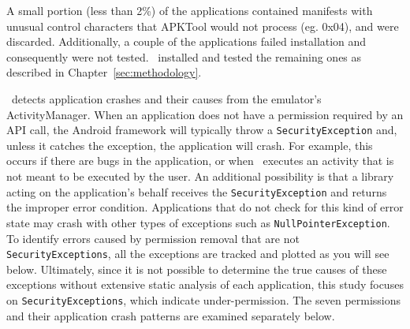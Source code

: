 A small portion (less than 2\%) of the applications contained manifests with unusual control characters that APKTool would not process (eg. 0x04), and were discarded.  Additionally, a couple of the applications failed installation and consequently were not tested. \toolname\ installed and tested the remaining ones as described in Chapter~\ref{sec:methodology}. 

\toolname\ detects application crashes and their causes from the emulator's ActivityManager.  When an application does not have a permission required by an API call, the Android framework will typically throw a \texttt{SecurityException} and, unless it catches the exception, the application will crash.   For example, this occurs if there are bugs in the application, or when \toolname\ executes an activity that is not meant to be executed by the user.  An additional possibility is that a library acting on the application's behalf receives the \texttt{SecurityException} and returns the improper error condition.  Applications that do not check for this kind of error state may crash with other types of exceptions such as \texttt{NullPointerException}.  To identify errors caused by permission removal that are not \texttt{SecurityExceptions}, all the exceptions are tracked and plotted as you will see below.  Ultimately, since it is not possible to determine the true causes of these exceptions without extensive static analysis of each application, this study focuses on \texttt{SecurityExceptions}, which indicate under-permission.  The seven permissions and their application crash patterns are examined separately below.


